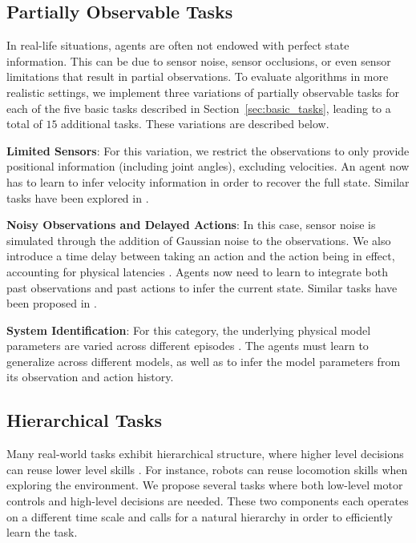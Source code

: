 \documentclass{article}
\begin{document}
\subsection{Partially Observable Tasks}

In real-life situations, agents are often not endowed with perfect state information. This can be due to sensor noise, sensor occlusions, or even sensor limitations that result in partial observations. To evaluate algorithms in more realistic settings, we implement three variations of partially observable tasks for each of the five basic tasks described in Section~\ref{sec:basic_tasks}, leading to a total of $15$ additional tasks. These variations are described below.



{\bf Limited Sensors}: For this variation, we restrict the observations to only provide positional information (including joint angles), excluding velocities. An agent now has to learn to infer velocity information in order to recover the full state. Similar tasks have been explored in \citet{gomez19982, schafer2005solving, heess2015memory, wierstra2007solving}.

{\bf Noisy Observations and Delayed Actions}: In this case, sensor noise is simulated through the addition of Gaussian noise to the observations. We also introduce a time delay between taking an action and the action being in effect, accounting for physical latencies \cite{hester2013open}. Agents now need to learn to integrate both past observations and past actions to infer the current state. Similar tasks have been proposed in \citet{bakker2001reinforcement}.

{\bf System Identification}: For this category, the underlying physical model parameters are varied across different episodes \cite{szita2003varepsilon}. The agents must learn to generalize across different models, as well as to infer the model parameters from its observation and action history. 

\subsection{Hierarchical Tasks}
\label{subsection:hierarchical_tasks}

Many real-world tasks exhibit hierarchical structure, where higher level decisions can reuse lower level skills \cite{parr1998reinforcement, sutton1999between, Dietterich:2000}. For instance, robots can reuse locomotion skills when exploring the environment. We propose several tasks where both low-level motor controls and high-level decisions are needed. These two components each operates on a different time scale and calls for a natural hierarchy in order to efficiently learn the task.
\end{document}
